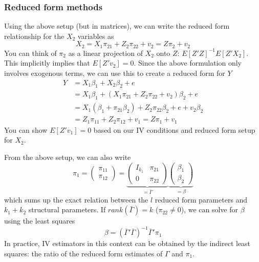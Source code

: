 \documentclass[12pt]{article}
\theoremstyle{definition}
\theoremstyle{property}
\theoremstyle{assumption}
\theoremstyle{example}
\theoremstyle{comment}
\begin{document}
\subsubsection{Reduced form methods}
Using the above setup (but in matrices), we can write the reduced form relationship for the $X_2$ variables as
\[
X_2 = X_1\pi_{21} + Z_2\pi_{22}+v_2 = Z\pi_2+v_2
\]
You can think of $\pi_2$ as a linear projection of $X_2$ onto $Z$: $E[Z'Z]^{-1}E[Z'X_2]$. This implicitly implies that  $E[Z'v_2]=0$. Since the above formulation only involves exogenous terms, we can use this to create a reduced form for $Y$
\[
\begin{aligned}
Y&=X_1\beta_1+X_2\beta_2+e\\
&=X_1\beta_1+(X_1\pi_{21} + Z_2\pi_{22}+v_2)\beta_2+e\\
&=X_1(\beta_1+\pi_{21}\beta_2)+Z_2\pi_{22}\beta_2+e+v_2\beta_2\\
&=Z_1\pi_{11}+Z_2\pi_{12}+v_1 = Z\pi_1+v_1
\end{aligned}
\]
You can show $E[Z'v_1]=0$ based on our IV conditions and reduced form setup for $X_2$. 
\par
From the above setup, we can also write
\[
\pi_1 = \begin{pmatrix}\pi_{11} \\ \pi_{12}\end{pmatrix} =\underbrace{\begin{pmatrix} I_{k_1} & \pi_{21}\\ 0 & \pi_{22} \end{pmatrix}}_{=\bar{\Gamma}}\underbrace{\begin{pmatrix}\beta_{1} \\ \beta_{2}\end{pmatrix}}_{=\beta}
\]
which sums up the exact relation between the $l$ reduced form parameters and $k_1+k_2$ structural parameters. If $rank(\bar{\Gamma})=k$ ($\pi_{22}\neq0$), we can solve for $\beta$ using the least squares
\[
\beta= (\bar{\Gamma}'\bar{\Gamma})^{-1}\bar{\Gamma}'\pi_1 
\]
In practice, IV estimators in this context can be obtained by the indirect least squares: the ratio of the reduced form estimates of $\Gamma$ and $\pi_1$.
\end{document}
